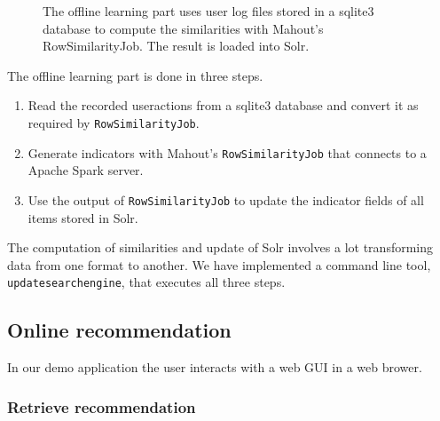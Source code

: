 \begin{figure}
\centering
{}
\caption{The offline learning part uses user log files stored in a sqlite3 database to compute the similarities with Mahout's {\ttfamily RowSimilarityJob}. The result is loaded into Solr.}
\label{fig:offline}
\end{figure}

The offline learning part is done in three steps.

\begin{enumerate}
\item Read the recorded \glspl{useraction} from a sqlite3 database and convert it as required by \verb|RowSimilarityJob|.
\item Generate \glspl{indicator} with Mahout's \verb|RowSimilarityJob| that connects to a Apache Spark server.
\item Use the output of \verb|RowSimilarityJob| to update the indicator fields of all items stored in Solr.
\end{enumerate}

The computation of similarities and update of Solr involves a lot transforming data from one format to another. We have implemented a command line tool, \verb|updatesearchengine|, that executes all three steps. 

\subsection{Online recommendation}
\label{sec:online}

In our demo application the user interacts with a web GUI in a web brower. 
\subsubsection{Retrieve recommendation}

